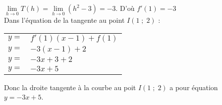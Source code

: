 $\lim\limits_{h \to 0}T(h) = \lim\limits_{h \to 0} (h^2 - 3) = -3$. D'où $f'(1) = -3$ \\

Dans l'équation de la tangente au point $I(1 \; ; \; 2)$ :  \\

\begin{tabular}{ll}
$y = $ & $f'(1)(x-1) + f(1)$ \\
$y = $ & $-3\left(x-1\right) + 2$ \\
$y = $ & $-3x + 3 + 2$ \\
$y = $ & $-3x + 5$ \\
\end{tabular}

\vspace*{.3cm} 

Donc la droite tangente à la courbe au poit $I(1 \; ; \; 2)$ a pour équation $y = -3x + 5$. 


\ifdefined\COMPLETE
\else
    
\fi